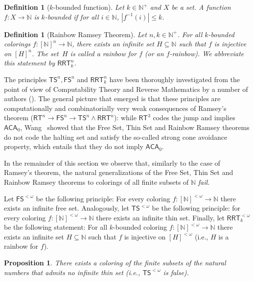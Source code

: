 \documentclass[10pt,a4paper]{article}
\newcommand{\ACA}[0]{\mathsf{ACA}}
\newcommand{\RRT}[0]{\mathsf{RRT}}
\newcommand{\FS}[0]{\mathsf{FS}}
\newcommand{\TS}[0]{\mathsf{TS}}
\newcommand{\RT}[0]{\mathsf{RT}}
\newcommand{\NN}[0]{\mathbb{N}}
\numberwithin{theorem}{section}
\newtheorem{proposition}[theorem]{Proposition}
\newtheorem{definition}[theorem]{Definition}
\begin{document}
\begin{definition}[$k$-bounded function]
 Let $k\in\NN^+$ and $X$ be a set. A function $f : X \to \NN$ is $k$-bounded if for all $i\in \NN$, 
 $|f^{-1}(i)|\leq k$.
\end{definition}

\begin{definition}[Rainbow Ramsey Theorem]
Let $n, k\in \NN^+$. For all $k$-bounded colorings $f:[\NN]^{n} \to \NN$, there exists an infinite set $H\subseteq \NN$ such that $f$ is injective on $[H]^{n}$. The set~$H$ is called a \emph{rainbow} for $f$ (or an $f$-rainbow).
We abbreviate this statement by $\RRT^{n}_k$. 
\end{definition}

The principles $\TS^n, \FS^n$ and $\RRT^n_k$ have been thoroughly investigated from the point of view of Computability Theory and Reverse Mathematics by a number of authors (\cite{Cholak_Giusto_Hirst_Jockusch_2005, Pat:16, cholak2020thin, Liu2022-LIUTRM}). The general picture that emerged is that these principles are computationally and combinatorially very weak consequences of Ramsey's theorem ($\RT^n \to \FS^n \to \TS^n \wedge \RRT^n$): while $\RT^3$ codes the jump and implies $\ACA_0$, Wang~\cite{wang2014some} showed that the Free Set, Thin Set and Rainbow Ramsey theorems do not code the halting set and satisfy the so-called strong cone avoidance property, which entails that they do not imply $\ACA_0$. 

In the remainder of this section we observe that, similarly to the case of Ramsey's theorem, the natural generalizations of the Free Set, Thin Set and Rainbow Ramsey theorems to colorings of all finite subsets of $\NN$ {\em fail}. 

Let $\FS^{<\omega}$ be the following principle: For every coloring $f:[\NN]^{<\omega} \to \NN$ there exists an infinite free set. Analogously, let $\TS^{<\omega}$ be the following principle: for every coloring $f:[\NN]^{<\omega} \to \NN$ there exists an infinite thin set. 
Finally, let $\RRT^{<\omega}_k$ be the following statement: For all $k$-bounded coloring $f:[\NN]^{<\omega} \to \NN$ there exists
an infinite set $H\subseteq \NN$ such that $f$ is injective on $[H]^{<\omega}$ (i.e., $H$ is a rainbow for $f$). 


\begin{proposition}
There exists a coloring of the finite subsets of the natural numbers that admits no infinite thin set (i.e., $\TS^{<\omega}$ is false).
\end{proposition}
\end{document}
